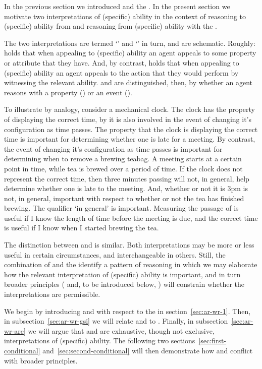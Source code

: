\begin{note}
  In the previous section we introduced \gsi{-} and the \aben{}.
  In the present section we motivate two interpretations of (specific) ability in the context of reasoning to (specific) ability from \gsi{} and reasoning from (specific) ability with the \aben{}.

  The two interpretations are termed `\AR{}' and `\WR{}' in turn, and are schematic.
  Roughly:
  \AR{} holds that when appealing to (specific) ability an agent appeals to some property or attribute that they have.
  And, by contrast, \WR{} holds that when appealing to (specific) ability an agent appeals to the action that they would perform by witnessing the relevant ability.
  \AR{} and \WR{} are distinguished, then, by whether an agent reasons with a property (\AR{}) or an event (\WR{}).

  To illustrate by analogy, consider a mechanical clock.
  The clock has the property of displaying the correct time, by it is also involved in the event of changing it's configuration as time passes.
  The property that the clock is displaying the correct time is important for determining whether one is late for a meeting.
  By contrast, the event of changing it's configuration as time passes is important for determining when to remove a brewing teabag.
  A meeting starts at a certain point in time, while tea is brewed over a period of time.
  If the clock does not represent the correct time, then three minutes passing will not, in general, help determine whether one is late to the meeting.
  And, whether or not it is 3pm is not, in general, important with respect to whether or not the tea has finished brewing.
  The qualifier `in general' is important.
  Measuring the passage of is useful if I know the length of time before the meeting is due, and the correct time is useful if I know when I started brewing the tea.

  The distinction between \AR{} and \WR{} is similar.
  Both interpretations may be more or less useful in certain circumstances, and interchangeable in others.
  Still, the combination of \gsi{} and the \aben{} identify a pattern of reasoning in which we may elaborate how the relevant interpretation of (specific) ability is important, and in turn broader principles (\ESU{} and, to be introduced below, \nI{}) will constrain whether the interpretations are permissible.

  We begin by introducing \AR{} and \WR{} with respect to the \aben{} in section~\ref{sec:ar-wr-1}.
  Then, in subsection~\ref{sec:ar-wr-gsi} we will relate \AR{} and \WR{} to \gsi{}.
  Finally, in subsection~\ref{sec:ar-wr-are} we will argue that \AR{} and \WR{} are exhaustive, though not exclusive, interpretations of (specific) ability.
  The following two sections~\ref{sec:first-conditional} and~\ref{sec:second-conditional} will then demonstrate how \WR{} and \AR{} conflict with broader principles.
\end{note}

